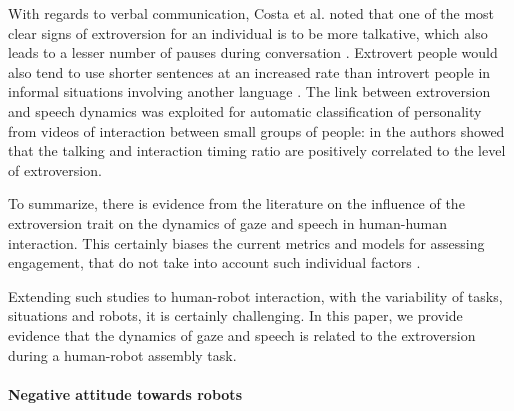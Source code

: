 With regards to verbal communication, Costa et al. \cite{NEOPIR1998} noted that one of the most clear signs of extroversion for an individual is to be more talkative, which also leads to a lesser number of pauses during conversation \cite{Scherer1981}. Extrovert people would also tend to use shorter sentences at an increased rate than introvert people in informal situations involving another language \cite{Dewaele00}. 
The link between extroversion and speech dynamics was exploited for automatic classification of personality from videos of interaction between small groups of people: in \cite{Pianesi08,Lepri2010} the authors showed that the talking and interaction timing ratio are positively correlated to the level of extroversion.

To summarize, there is evidence from the literature on the influence of the extroversion trait on the dynamics of gaze and speech in human-human interaction. This certainly biases the current metrics and models for assessing engagement, that do not take into account such individual factors \cite{Anzalone2015engagement,rich2010recognizing}. 

Extending such studies to human-robot interaction, with the variability of tasks, situations and robots, it is certainly challenging. In this paper, we provide evidence that the dynamics of gaze and speech is related to the extroversion during a human-robot assembly task.





\paragraph{Negative attitude towards robots}


